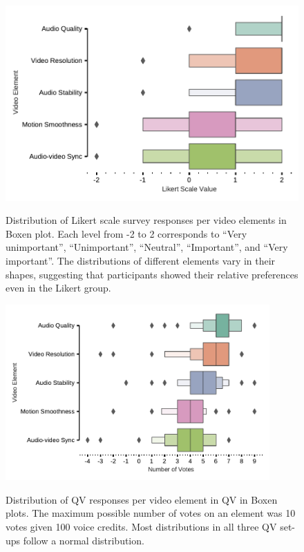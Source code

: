 \begin{figure}[htpb]
\centering
\begin{minipage}[b]{0.44\linewidth}
\includegraphics[width=\textwidth, keepaspectratio=true]{content/image/likert_distribution_per_element (1).pdf}
    \caption{
      Distribution of Likert scale survey responses per video elements in Boxen plot. 
      Each level from -2 to 2 corresponds to 
      ``Very unimportant'', ``Unimportant'', ``Neutral'', ``Important'', and ``Very important''.
      The distributions of different elements vary in their shapes, suggesting that participants showed their relative preferences even in the Likert group.
    }
    \label{fig:likert_exp2}
\end{minipage}
\quad
\begin{minipage}[b]{0.52\linewidth}
\includegraphics[width=0.9\textwidth, keepaspectratio=true]{content/image/qv_distribution_per_element.pdf}
    \caption{
      Distribution of QV responses per video element in QV in Boxen plots. The maximum possible number of votes on an element was 10 votes given 100 voice credits. Most distributions in all three QV set-ups follow a normal distribution. 
    }
    \label{fig:qv3_exp2}
\end{minipage}
\end{figure}

